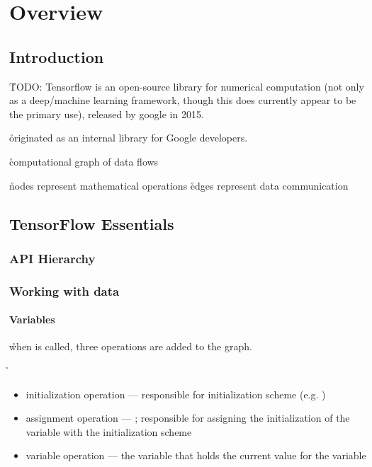 \chapter{Overview}


\section{Introduction}

\r{TODO: Tensorflow is an open-source library for numerical computation (not only as a deep/machine learning framework, though this does currently appear to be the primary use), released by google in 2015.}

\r{originated as an internal library for Google developers.}

\r{computational graph of data flows}

\r{nodes represent mathematical operations}
\r{edges represent data communication}




\section{TensorFlow Essentials}

\subsection{API Hierarchy}

\subsection{Working with data}

\subsubsection{Variables}

\r{when  is called, three operations are added to the graph.}

\r{
\begin{itemize}
	\item initialization operation --- responsible for initialization scheme (e.g. )
	\item assignment operation --- ; responsible for assigning the initialization of the variable with the initialization scheme
	\item variable operation --- the variable that holds the current value for the variable
\end{itemize}
}


